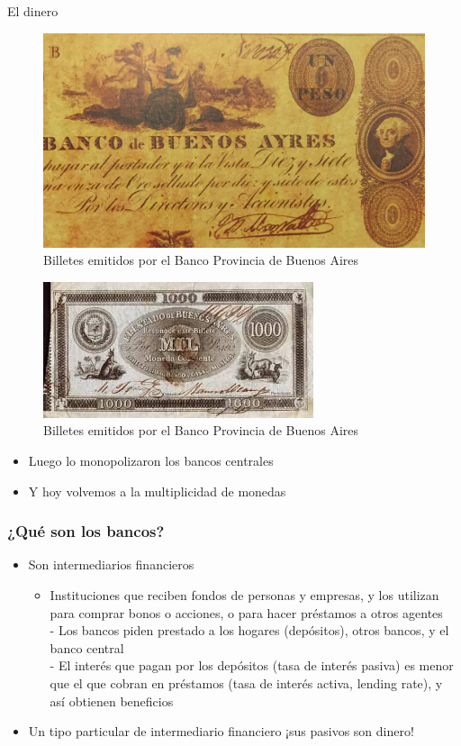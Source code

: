 \documentclass{beamer}
\begin{document}
\begin{frame}{El dinero}
        \begin{figure} [H]   
  \centering
  \includegraphics[width=.35\textwidth]{Figures/C32.4.jpg}
      \caption{Billetes emitidos por el Banco Provincia de Buenos Aires}
  \label{fig:C32.4}
\end{figure}

\begin{figure} [H]   
\centering\includegraphics[width=.35\textwidth]{Figures/C32.5.jpg}
\caption{Billetes emitidos por el Banco Provincia de Buenos Aires}
\end{figure}
       \begin{itemize}
           \item  Luego lo monopolizaron los bancos centrales
    \item Y hoy volvemos a la multiplicidad de monedas 
       \end{itemize}     
        \end{frame}
        
\begin{frame}
\frametitle{¿Qué son los bancos?}
\begin{itemize}
    \item Son intermediarios financieros
        \begin{itemize}
        \item Instituciones que reciben fondos de personas y empresas, y los utilizan para comprar bonos o acciones, o para hacer préstamos a otros agentes \\
        - Los bancos piden prestado a los hogares (depósitos), otros bancos, y el banco central \\
        - El interés que pagan por los depósitos (tasa de interés pasiva) es menor que el que cobran en préstamos (tasa de interés activa, lending rate), y así obtienen beneficios
        \end{itemize}
    \item Un tipo particular de intermediario financiero
    ¡sus pasivos son dinero!
\end{itemize}
\end{frame}
\end{document}
